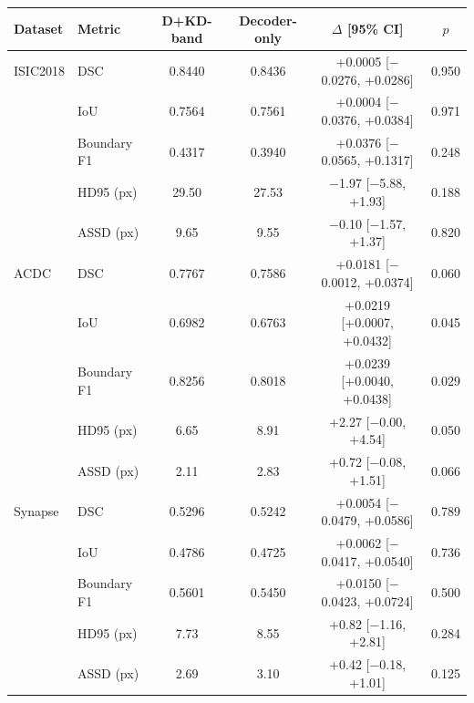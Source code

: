 \begin{tabular}{llcccc}
\toprule
Dataset & Metric & D+KD-band & Decoder-only & $\Delta$ [95\% CI] & $p$ \\
\midrule
ISIC2018 & DSC & 0.8440 & 0.8436 & +0.0005 [$-$0.0276, +0.0286] & 0.950 \\
 & IoU & 0.7564 & 0.7561 & +0.0004 [$-$0.0376, +0.0384] & 0.971 \\
 & Boundary F1 & 0.4317 & 0.3940 & +0.0376 [$-$0.0565, +0.1317] & 0.248 \\
 & HD95 (px) & 29.50 & 27.53 & $-$1.97 [$-$5.88, +1.93] & 0.188 \\
 & ASSD (px) & 9.65 & 9.55 & $-$0.10 [$-$1.57, +1.37] & 0.820 \\
\addlinespace
ACDC & DSC & 0.7767 & 0.7586 & +0.0181 [$-$0.0012, +0.0374] & 0.060 \\
 & IoU & 0.6982 & 0.6763 & +0.0219 [+0.0007, +0.0432] & 0.045 \\
 & Boundary F1 & 0.8256 & 0.8018 & +0.0239 [+0.0040, +0.0438] & 0.029 \\
 & HD95 (px) & 6.65 & 8.91 & +2.27 [$-$0.00, +4.54] & 0.050 \\
 & ASSD (px) & 2.11 & 2.83 & +0.72 [$-$0.08, +1.51] & 0.066 \\
\addlinespace
Synapse & DSC & 0.5296 & 0.5242 & +0.0054 [$-$0.0479, +0.0586] & 0.789 \\
 & IoU & 0.4786 & 0.4725 & +0.0062 [$-$0.0417, +0.0540] & 0.736 \\
 & Boundary F1 & 0.5601 & 0.5450 & +0.0150 [$-$0.0423, +0.0724] & 0.500 \\
 & HD95 (px) & 7.73 & 8.55 & +0.82 [$-$1.16, +2.81] & 0.284 \\
 & ASSD (px) & 2.69 & 3.10 & +0.42 [$-$0.18, +1.01] & 0.125 \\
\bottomrule
\end{tabular}
